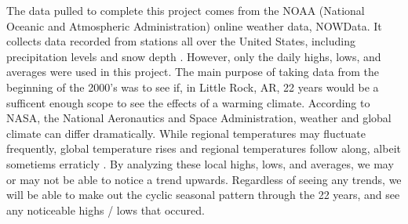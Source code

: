 The data pulled to complete this project comes from the NOAA (National Oceanic and Atmospheric Administration) online weather data, NOWData. It collects data recorded from stations all over the United States, including precipitation levels and snow depth \cite{NOWData}. However, only the daily highs, lows, and averages were used in this project. The main purpose of taking data from the beginning of the 2000's was to see if, in Little Rock, AR, 22 years would be a sufficent enough scope to see the effects of a warming climate. According to NASA, the National Aeronautics and Space Administration, weather and global climate can differ dramatically. While regional temperatures may fluctuate frequently, global temperature rises and regional temperatures follow along, albeit sometiems erraticly \cite{weather_vs_climate}. By analyzing these local highs, lows, and averages, we may or may not be able to notice a trend upwards. Regardless of seeing any trends, we will be able to make out the cyclic seasonal pattern through the 22 years, and see any noticeable highs / lows that occured. 
